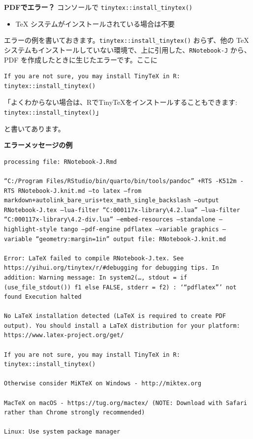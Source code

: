\documentclass[
]{bxjsbook}
\providecommand{\tightlist}{%
  \setlength{\itemsep}{0pt}\setlength{\parskip}{0pt}}
\theoremstyle{definition}
\theoremstyle{definition}
\theoremstyle{definition}
\theoremstyle{definition}
\theoremstyle{remark}
\begin{document}
\textbf{PDFでエラー？} コンソールで \texttt{tinytex::install\_tinytex()}

\begin{itemize}
\tightlist
\item
  TeX システムがインストールされている場合は不要
\end{itemize}

エラーの例を書いておきます。\texttt{tinytex::install\_tinytex()} おらず、他の TeX システムもインストールしていない環境で、上に引用した、\texttt{RNotebook-J} から、PDF を作成したときに生じたエラーです。ここに

\begin{verbatim}
If you are not sure, you may install TinyTeX in R: tinytex::install_tinytex()
\end{verbatim}

「よくわからない場合は、RでTinyTeXをインストールすることもできます: \texttt{tinytex::install\_tinytex()}」

と書いてあります。

\textbf{エラーメッセージの例}

\begin{verbatim}
processing file: RNotebook-J.Rmd

“C:/Program Files/RStudio/bin/quarto/bin/tools/pandoc” +RTS -K512m -RTS RNotebook-J.knit.md –to latex –from markdown+autolink_bare_uris+tex_math_single_backslash –output RNotebook-J.tex –lua-filter “C:000117x-library\4.2.lua” –lua-filter “C:000117x-library\4.2-div.lua” –embed-resources –standalone –highlight-style tango –pdf-engine pdflatex –variable graphics –variable “geometry:margin=1in” output file: RNotebook-J.knit.md

Error: LaTeX failed to compile RNotebook-J.tex. See https://yihui.org/tinytex/r/#debugging for debugging tips. In addition: Warning message: In system2(…, stdout = if (use_file_stdout()) f1 else FALSE, stderr = f2) : ‘“pdflatex”’ not found Execution halted

No LaTeX installation detected (LaTeX is required to create PDF output). You should install a LaTeX distribution for your platform: https://www.latex-project.org/get/

If you are not sure, you may install TinyTeX in R: tinytex::install_tinytex()

Otherwise consider MiKTeX on Windows - http://miktex.org

MacTeX on macOS - https://tug.org/mactex/ (NOTE: Download with Safari rather than Chrome strongly recommended)

Linux: Use system package manager
\end{verbatim}
\end{document}
